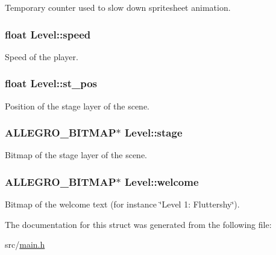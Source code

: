 \-Temporary counter used to slow down spritesheet animation. \hypertarget{structLevel_a936a1d131d1e056878474ca831c5e88f}{
\subsubsection[{speed}]{\setlength{\rightskip}{0pt plus 5cm}float {\bf \-Level\-::speed}}}\label{structLevel_a936a1d131d1e056878474ca831c5e88f}
\-Speed of the player. \hypertarget{structLevel_ab13f799d9e2e06a04debbd97676fb512}{
\subsubsection[{st\-\_\-pos}]{\setlength{\rightskip}{0pt plus 5cm}float {\bf \-Level\-::st\-\_\-pos}}}\label{structLevel_ab13f799d9e2e06a04debbd97676fb512}
\-Position of the stage layer of the scene. \hypertarget{structLevel_ad412b858a4e688114dd89a44ecb005bb}{
\subsubsection[{stage}]{\setlength{\rightskip}{0pt plus 5cm}\-A\-L\-L\-E\-G\-R\-O\-\_\-\-B\-I\-T\-M\-A\-P$\ast$ {\bf \-Level\-::stage}}}\label{structLevel_ad412b858a4e688114dd89a44ecb005bb}
\-Bitmap of the stage layer of the scene. \hypertarget{structLevel_a575fec7686bd94b5c35b15d73296c977}{
\subsubsection[{welcome}]{\setlength{\rightskip}{0pt plus 5cm}\-A\-L\-L\-E\-G\-R\-O\-\_\-\-B\-I\-T\-M\-A\-P$\ast$ {\bf \-Level\-::welcome}}}\label{structLevel_a575fec7686bd94b5c35b15d73296c977}
\-Bitmap of the welcome text (for instance \char`\"{}\-Level 1\-: Fluttershy\char`\"{}). 

\-The documentation for this struct was generated from the following file\-:\begin{DoxyCompactItemize}
\item 
src/\hyperlink{main_8h}{main.\-h}\end{DoxyCompactItemize}
